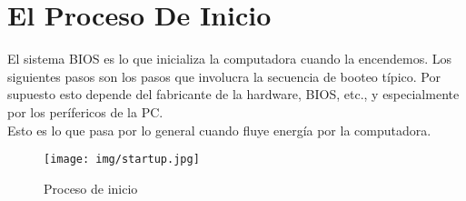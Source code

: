 \section{El Proceso De Inicio}\label{sec:el proceso de inicio} 
	El sistema BIOS es lo que inicializa la computadora cuando la encendemos.
	Los siguientes pasos son los pasos que involucra la secuencia de booteo
	típico.  Por supuesto esto depende del fabricante de la hardware, BIOS,
	etc., y especialmente por los perífericos de la PC. \\ Esto es lo que pasa
	por lo general cuando fluye energía por la computadora.

	\begin{figure}[H]
		\begin{center}
			\texttt{[image: img/startup.jpg]}
		\end{center}
		\caption{Proceso de inicio}
		\label{fig:proceso de inicio}
	\end{figure}
